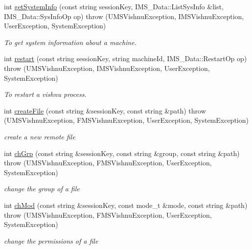 \begin{DoxyCompactItemize}
int \hyperlink{namespacevishnu_ab6cc46ec3fc97e19d7a57bcf42dee328}{getSystemInfo} (const string sessionKey, IMS\_\-Data::ListSysInfo \&list, IMS\_\-Data::SysInfoOp op)  throw (UMSVishnuException, IMSVishnuException, UserException, SystemException)
\begin{DoxyCompactList}\small\item\em To get system information about a machine. \item\end{DoxyCompactList}\item 
int \hyperlink{namespacevishnu_aa87ea9f13dc0bc74edd73e815c4bdf7c}{restart} (const string sessionKey, string machineId, IMS\_\-Data::RestartOp op)  throw (UMSVishnuException, IMSVishnuException, UserException, SystemException)
\begin{DoxyCompactList}\small\item\em To restart a vishnu process. \item\end{DoxyCompactList}\item 
int \hyperlink{namespacevishnu_a7719eac49c7e537d743d0dbcb4bdb627}{createFile} (const string \&sessionKey, const string \&path)  throw (UMSVishnuException, FMSVishnuException, UserException, SystemException)
\begin{DoxyCompactList}\small\item\em create a new remote file \item\end{DoxyCompactList}\item 
int \hyperlink{namespacevishnu_a1dd41a50658d5aa0cdb4b46a654359e7}{chGrp} (const string \&sessionKey, const string \&group, const string \&path)  throw (UMSVishnuException, FMSVishnuException, UserException, SystemException)
\begin{DoxyCompactList}\small\item\em change the group of a file \item\end{DoxyCompactList}\item 
int \hyperlink{namespacevishnu_a88fa0cf47d649d26a520b6d84be734d0}{chMod} (const string \&sessionKey, const mode\_\-t \&mode, const string \&path)  throw (UMSVishnuException, FMSVishnuException, UserException, SystemException)
\begin{DoxyCompactList}\small\item\em change the permissions of a file \item\end{DoxyCompactList}\item 

\end{DoxyCompactItemize}
